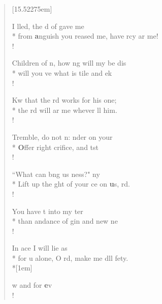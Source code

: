 \begin{flushleft}
\begin{verse}[15.52275em]

 I lled, the d of  gave me \\*
from \textbf{a}nguish you reased me, have rcy  ar me!\\!

 Children of n, how ng will my  be dis\\*
will you ve what is tile and ek   \\!

 Kw that the rd works  for his  one;\\*
the rd will ar me whever  ll him.\\!

 Tremble, do not n: nder on your    \\*
 \textbf{O}ffer right crifice, and tst   \\!

 ``What can bng us ness?" ny \\*
Lift up the ght of your ce on \textbf{u}s,  rd.\\!

 You have t into my   ter \\*
than andance of gin and new ne  \\!

 In ace I will lie    as\\*
for u alone, O rd, make me dll  fety.\\*[1em]

w and for \textbf{e}v \\!
\end{verse}
\end{flushleft}
